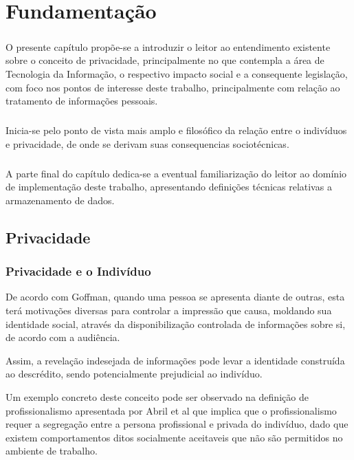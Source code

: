 \chapter{Fundamentação}
\label{cap2}

\paragraph{} O presente capítulo propõe-se a introduzir o leitor ao entendimento existente sobre o conceito de privacidade, principalmente no que contempla a área de Tecnologia da Informação, o respectivo impacto social e a consequente legislação, com foco nos pontos de interesse deste trabalho,
principalmente com relação ao tratamento de informações pessoais. 
\paragraph{} Inicia-se pelo ponto de vista mais amplo e filosófico da relação entre o indivíduos e privacidade, de onde se derivam suas consequencias sociotécnicas.
\paragraph{} A parte final do capítulo dedica-se a eventual familiarização do leitor ao domínio de implementação deste trabalho, apresentando definições técnicas relativas a armazenamento de dados.

\section{Privacidade}

\subsection{Privacidade e o Indivíduo}

De acordo com Goffman\cite{goffman1978presentation}, quando uma pessoa se apresenta diante de outras, esta terá motivações diversas para controlar a impressão que causa, moldando sua identidade social, através da disponibilização controlada de informações sobre si, de acordo com a audiência. 

Assim, a revelação indesejada de informações pode levar a identidade construída ao descrédito, sendo potencialmente prejudicial ao indivíduo.

Um exemplo concreto deste conceito pode ser observado na definição de profissionalismo apresentada por Abril et al \cite{sanchez2012blurred} que implica que o profissionalismo requer a segregação entre a persona profissional e privada do indivíduo, dado que existem comportamentos ditos socialmente aceitaveis que não são permitidos no ambiente de trabalho.

